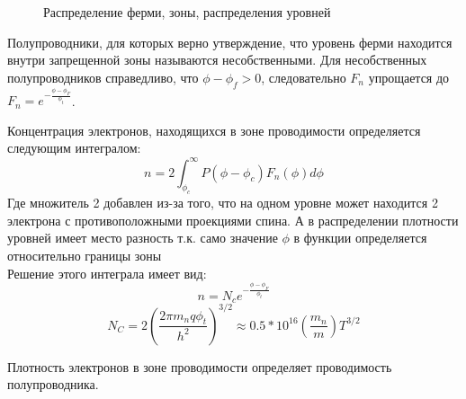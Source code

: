 \begin{center}
	\begin{figure}[H]
		\caption{Распределение ферми, зоны, распределения уровней}	
  		\label{img:fermi}
	\end{figure}
\end{center}	


Полупроводники, для которых верно утверждение, что уровень ферми находится внутри запрещенной зоны называются несобственными. Для несобственных полупроводников справедливо, что $\phi - \phi_f > 0$, следовательно $F_n$ упрощается до $F_n = e^{-\frac{\phi - \phi_F}{\phi_t}}$. 


Концентрация электронов, находящихся в зоне проводимости определяется следующим интегралом:
\begin{equation}
n = 2 \int_{\phi_c}^{\infty} P(\phi - \phi_c) F_n(\phi) d\phi
\end{equation}
Где множитель 2 добавлен из-за того, что на одном уровне может находится 2 электрона с противоположными проекциями спина. А в распределении плотности уровней имеет место разность т.к. само значение $\phi$ в функции определяется относительно границы зоны\\

Решение этого интеграла имеет вид:
\begin{equation}
n = N_c  e^{-\frac{\phi - \phi_F}{\phi_t}}
\end{equation}
\begin{equation}
N_C = 2 (\frac{2 \pi m_n q  \phi_t }{h^2})^{3/2} \approx 0.5 * 10^{16} (\frac{m_n}{m}) T^{3/2} 
\end{equation}

Плотность электронов в зоне проводимости определяет проводимость полупроводника.


